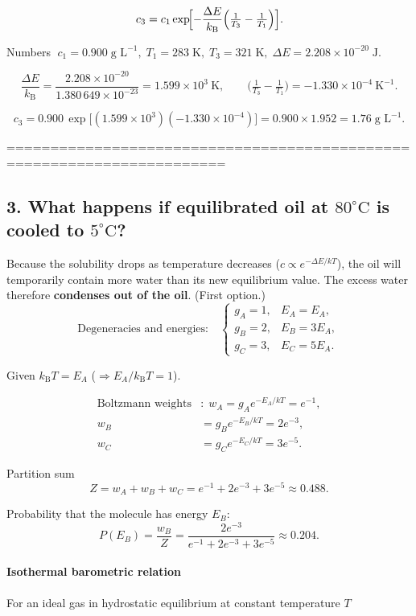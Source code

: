 \documentclass[12pt]{article}
\theoremstyle{definition} %
\theoremstyle{plain} %
\begin{document}
\[
  c_3
  = c_1
    \exp\!\Bigl[
      -\frac{\Delta E}{k_{\mathrm B}}
      \Bigl(\tfrac{1}{T_3}-\tfrac{1}{T_1}\Bigr)
    \Bigr].
\]

Numbers  
\(\;c_1 = 0.900\;\text{g L}^{-1},\;
  T_1 = 283\;\text{K},\;
  T_3 = 321\;\text{K},\;
  \Delta E = 2.208\times10^{-20}\;\text{J}\).

\[
  \frac{\Delta E}{k_{\mathrm B}}
    =\frac{2.208\times10^{-20}}{1.380\,649\times10^{-23}}
    = 1.599\times10^{3}\ \text{K},
\qquad
  \bigl(\tfrac{1}{T_3}-\tfrac{1}{T_1}\bigr)
    = -1.330\times10^{-4}\ \text{K}^{-1}.
\]

\[
  c_3
  = 0.900\,
    \exp\!\bigl[(1.599\times10^{3})(-1.330\times10^{-4})\bigr]
  = 0.900 \times 1.952
  = \boxed{1.76\;\text{g L}^{-1}}.
\]

=======================================================================
\subsection*{3. What happens if equilibrated oil at \(80^{\circ}\text{C}\)
is cooled to \(5^{\circ}\text{C}\)?}

Because the solubility drops as temperature decreases
(\(c \propto e^{-\Delta E/kT}\)), the oil will temporarily contain more
water than its new equilibrium value.  The excess water therefore
\textbf{condenses out of the oil}.  (First option.)
\[
  \text{Degeneracies and energies:}\quad
  \begin{cases}
    g_A = 1, & E_A = E_A,\\
    g_B = 2, & E_B = 3E_A,\\
    g_C = 3, & E_C = 5E_A.
  \end{cases}
\]

Given \(k_{\mathrm B}T = E_A\) (\( \Rightarrow E_A/k_{\mathrm B}T = 1\)).

\[
\begin{aligned}
\text{Boltzmann weights}&:\;
w_A = g_A e^{-E_A/kT}=e^{-1},\\
w_B &= g_B e^{-E_B/kT}=2e^{-3},\\
w_C &= g_C e^{-E_C/kT}=3e^{-5}.
\end{aligned}
\]

Partition sum  
\[
  Z = w_A + w_B + w_C
    = e^{-1}+2e^{-3}+3e^{-5}\approx0.488.
\]

Probability that the molecule has energy \(E_B\):
\[
  P(E_B)
  = \frac{w_B}{Z}
  = \frac{2e^{-3}}{e^{-1}+2e^{-3}+3e^{-5}}
  \approx \boxed{0.204}.
\]
\paragraph{Isothermal barometric relation}
For an ideal gas in hydrostatic equilibrium at constant temperature \(T\)
\end{document}

